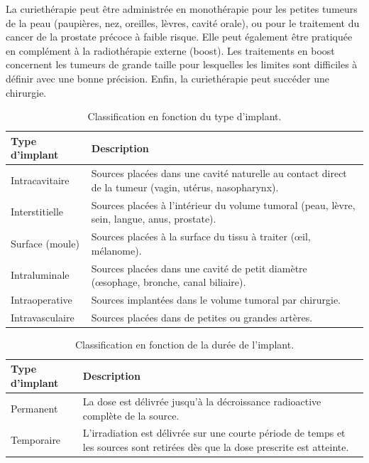 La curiethérapie peut être administrée en monothérapie pour les petites tumeurs de la peau (paupières, nez, oreilles, lèvres, cavité orale), ou pour le traitement du cancer de la prostate précoce à faible risque. Elle peut également être pratiquée en complément à la radiothérapie externe (boost). Les traitements en boost concernent les tumeurs de grande taille pour lesquelles les limites sont difficiles à définir avec une bonne précision. Enfin, la curiethérapie peut succéder une chirurgie.
%
\begin {table}[http]
\caption{Classification en fonction du type d’implant.}
\label{TypeImplant} 
\renewcommand{\arraystretch}{1.4}
	\begin{tabular}{p{5.5cm} p{9.0cm}}
		\toprule[1.25pt]
        \hline
        Type d'implant         &                            Description   \\ 
        \hline
		Intracavitaire         & Sources placées dans une cavité naturelle au contact direct de la tumeur (vagin, utérus, 				nasopharynx). \\ 
		Interstitielle 	   	   & Sources placées à l’intérieur du volume tumoral (peau, lèvre, sein, langue, anus, prostate). \\ 
		Surface (moule)        & Sources placées à la surface du tissu à traiter (œil, mélanome). \\ 
		Intraluminale          & Sources placées dans une cavité de petit diamètre (œsophage, bronche, canal biliaire). \\ 
        Intraoperative         & Sources implantées dans le volume tumoral par chirurgie. \\ 
        Intravasculaire        & Sources placées dans de petites ou grandes artères. \\
        \bottomrule[1.25pt]
	\end{tabular} 
\end {table}
%
\begin {table}[ht!]
\caption{Classification en fonction de la durée de l’implant.}
\label{DureeImplant} 
\renewcommand{\arraystretch}{1.4}
	\begin{tabular}{p{5.5cm} p{9.0cm}}
		\toprule[1.3pt]
        \hline
        Type d'implant     &                            Description   \\ 
        \hline
        Permanent          &  La dose est délivrée jusqu’à la décroissance radioactive complète de la source. \\ 
		Temporaire  	   & L’irradiation est délivrée sur une courte période de temps et les sources sont retirées dès que la dose prescrite est atteinte. \\ 
        \bottomrule[1.3pt]
	\end{tabular} 
\end {table}

